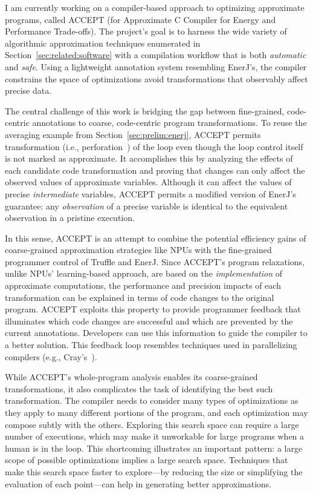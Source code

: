 I am currently working on a compiler-based approach to optimizing approximate
programs, called ACCEPT (for Approximate C Compiler for Energy and Performance
Trade-offs). The project's goal is to harness the wide variety of
algorithmic approximation techniques enumerated in
Section~\ref{sec:related:software} with a compilation workflow that is both
\emph{automatic} and \emph{safe}. Using a lightweight annotation system
resembling EnerJ's, the compiler constrains the space of optimizations avoid
transformations that observably affect precise data.

The central challenge of this work is bridging the gap between fine-grained,
code-centric annotations to coarse, code-centric program transformations. To
reuse the averaging example from Section~\ref{sec:prelim:enerj}, ACCEPT
permits transformation (i.e., perforation~\cite{perforation}) of the
 loop even though the loop control itself is not marked as
approximate. It accomplishes this by analyzing the effects of each candidate
code transformation and proving that changes can only affect the
observed values of approximate variables. Although it can affect the values of
precise \emph{intermediate} variables, ACCEPT permits a modified version of
EnerJ's guarantee: any \emph{observation} of a precise variable is identical
to the equivalent observation in a pristine execution.

In this sense, ACCEPT is an attempt to combine the potential efficiency gains
of coarse-grained approximation strategies like NPUs with the fine-grained
programmer control of Truffle and EnerJ. Since ACCEPT's program relaxations,
unlike NPUs' learning-based approach, are based on the \emph{implementation}
of approximate computations, the performance and precision impacts of each
transformation can be explained in terms of code changes to the original
program. ACCEPT exploits this property to provide programmer feedback that
illuminates which code changes are successful and which are prevented by the
current annotations. Developers can use this information to guide the compiler
to a better solution. This feedback loop resembles techniques used in
parallelizing compilers (e.g., Cray's~\cite{canal}).

While ACCEPT's whole-program analysis enables its coarse-grained
transformations, it also complicates the task of identifying the best such
transformation. The compiler needs to consider many types of optimizations as
they apply to many different portions of the program, and each optimization
may compose subtly with the others. Exploring this search space can require
a large number of executions, which may make it unworkable for large programs
when a human is in the loop. This shortcoming illustrates an important
pattern: a large scope of possible optimizations implies a large search space.
Techniques that make this search space faster to explore---by reducing the
size or simplifying the evaluation of each point---can help in generating
better approximations.



